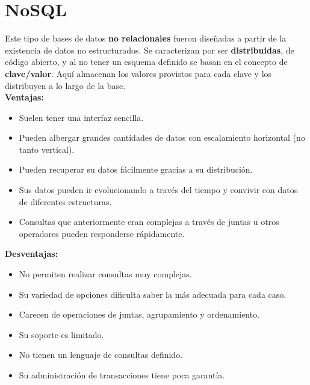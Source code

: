 \section*{NoSQL}
Este tipo de bases de datos \textbf{no relacionales} fueron diseñadas a partir de la existencia de datos no estructurados. Se caracterizan por ser \textbf{distribuidas}, de código abierto, y al no tener un esquema definido se basan en el concepto de \textbf{clave/valor}. Aquí almacenan los valores provistos para cada clave y los distribuyen a lo largo de la base. \\
\textbf{Ventajas:}
\begin{itemize}
    \item Suelen tener una interfaz sencilla.
    \item Pueden albergar grandes cantidades de datos con escalamiento horizontal (no tanto vertical).
    \item Pueden recuperar su datos fácilmente gracias a su distribución.
    \item Sus datos pueden ir evolucionando a través del tiempo y convivir con datos de diferentes estructuras.
    \item Consultas que anteriormente eran complejas a través de juntas u otros operadores pueden responderse rápidamente.
\end{itemize}
\textbf{Desventajas:}
\begin{itemize}
    \item No permiten realizar consultas muy complejas.
    \item Su variedad de opciones dificulta saber la más adecuada para cada caso.
    \item Carecen de operaciones de juntas, agrupamiento y ordenamiento.
    \item Su soporte es limitado.
    \item No tienen un lenguaje de consultas definido.
    \item Su administración de transacciones tiene poca garantía.
\end{itemize}

